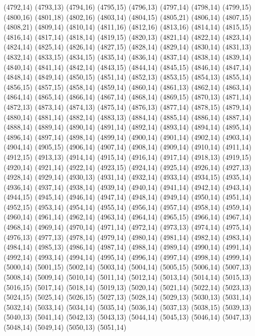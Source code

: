 (4792,14)
(4793,13)
(4794,16)
(4795,15)
(4796,13)
(4797,14)
(4798,14)
(4799,15)
(4800,16)
(4801,18)
(4802,16)
(4803,14)
(4804,15)
(4805,21)
(4806,14)
(4807,15)
(4808,21)
(4809,14)
(4810,14)
(4811,16)
(4812,16)
(4813,16)
(4814,14)
(4815,15)
(4816,14)
(4817,14)
(4818,14)
(4819,15)
(4820,13)
(4821,14)
(4822,14)
(4823,14)
(4824,14)
(4825,14)
(4826,14)
(4827,15)
(4828,14)
(4829,14)
(4830,14)
(4831,13)
(4832,14)
(4833,15)
(4834,15)
(4835,14)
(4836,14)
(4837,14)
(4838,14)
(4839,14)
(4840,14)
(4841,14)
(4842,14)
(4843,15)
(4844,14)
(4845,15)
(4846,14)
(4847,14)
(4848,14)
(4849,14)
(4850,15)
(4851,14)
(4852,13)
(4853,15)
(4854,13)
(4855,14)
(4856,15)
(4857,15)
(4858,14)
(4859,14)
(4860,14)
(4861,13)
(4862,14)
(4863,14)
(4864,14)
(4865,14)
(4866,14)
(4867,14)
(4868,14)
(4869,15)
(4870,13)
(4871,14)
(4872,13)
(4873,14)
(4874,13)
(4875,14)
(4876,13)
(4877,14)
(4878,15)
(4879,14)
(4880,14)
(4881,14)
(4882,14)
(4883,13)
(4884,14)
(4885,14)
(4886,14)
(4887,14)
(4888,14)
(4889,14)
(4890,14)
(4891,14)
(4892,14)
(4893,14)
(4894,14)
(4895,14)
(4896,14)
(4897,14)
(4898,14)
(4899,14)
(4900,14)
(4901,14)
(4902,14)
(4903,14)
(4904,14)
(4905,15)
(4906,14)
(4907,14)
(4908,14)
(4909,14)
(4910,14)
(4911,14)
(4912,15)
(4913,13)
(4914,14)
(4915,14)
(4916,14)
(4917,14)
(4918,13)
(4919,15)
(4920,14)
(4921,14)
(4922,14)
(4923,15)
(4924,14)
(4925,14)
(4926,14)
(4927,13)
(4928,14)
(4929,14)
(4930,13)
(4931,14)
(4932,14)
(4933,14)
(4934,15)
(4935,14)
(4936,14)
(4937,14)
(4938,14)
(4939,14)
(4940,14)
(4941,14)
(4942,14)
(4943,14)
(4944,15)
(4945,14)
(4946,14)
(4947,14)
(4948,14)
(4949,14)
(4950,14)
(4951,14)
(4952,15)
(4953,14)
(4954,14)
(4955,14)
(4956,14)
(4957,14)
(4958,14)
(4959,14)
(4960,14)
(4961,14)
(4962,14)
(4963,14)
(4964,14)
(4965,15)
(4966,14)
(4967,14)
(4968,14)
(4969,14)
(4970,14)
(4971,14)
(4972,14)
(4973,13)
(4974,14)
(4975,14)
(4976,13)
(4977,13)
(4978,14)
(4979,14)
(4980,14)
(4981,14)
(4982,14)
(4983,14)
(4984,14)
(4985,13)
(4986,14)
(4987,14)
(4988,14)
(4989,14)
(4990,14)
(4991,14)
(4992,14)
(4993,14)
(4994,14)
(4995,14)
(4996,14)
(4997,14)
(4998,14)
(4999,14)
(5000,14)
(5001,15)
(5002,14)
(5003,14)
(5004,14)
(5005,15)
(5006,14)
(5007,13)
(5008,14)
(5009,14)
(5010,14)
(5011,14)
(5012,14)
(5013,14)
(5014,14)
(5015,13)
(5016,15)
(5017,14)
(5018,14)
(5019,13)
(5020,14)
(5021,14)
(5022,14)
(5023,13)
(5024,15)
(5025,14)
(5026,15)
(5027,13)
(5028,14)
(5029,13)
(5030,13)
(5031,14)
(5032,14)
(5033,14)
(5034,14)
(5035,14)
(5036,14)
(5037,13)
(5038,15)
(5039,13)
(5040,13)
(5041,14)
(5042,13)
(5043,13)
(5044,14)
(5045,13)
(5046,14)
(5047,13)
(5048,14)
(5049,14)
(5050,13)
(5051,14)
